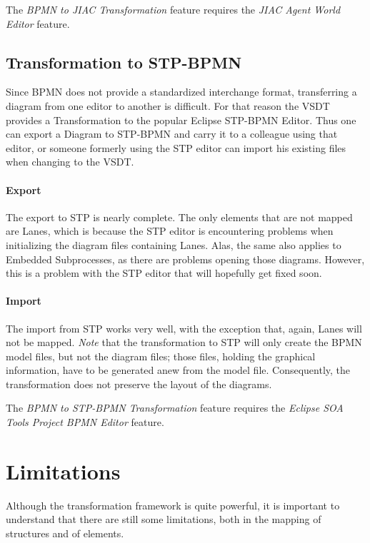 The \emph{BPMN to JIAC Transformation} feature requires the \emph{JIAC Agent World
Editor} feature.


\subsection{Transformation to STP-BPMN}

Since BPMN does not provide a standardized interchange format, transferring a
diagram from one editor to another is difficult.  For that reason the VSDT provides
a Transformation to the popular Eclipse STP-BPMN Editor.  Thus one can export a
Diagram to STP-BPMN and carry it to a colleague using that editor, or someone
formerly using the STP editor can import his existing files when changing to the
VSDT.

\paragraph{Export}
The export to STP is nearly complete.  The only elements that are not mapped are
Lanes, which is because the STP editor is encountering problems when initializing
the diagram files containing Lanes.  Alas, the same also applies to Embedded
Subprocesses, as there are problems opening those diagrams.  However, this is a
problem with the STP editor that will hopefully get fixed soon.

\paragraph{Import}
The import from STP works very well, with the exception that, again, Lanes will
not be mapped. \emph{Note} that the transformation to STP will only create the
BPMN model files, but not the diagram files; those files, holding the graphical
information, have to be generated anew from the model file.  Consequently, the
transformation does not preserve the layout of the diagrams.

The \emph{BPMN to STP-BPMN Transformation} feature requires the \emph{Eclipse SOA
Tools Project BPMN Editor} feature.



\section{Limitations}

Although the transformation framework is quite powerful, it is important to
understand that there are still some limitations, both in the mapping of
structures and of elements.

